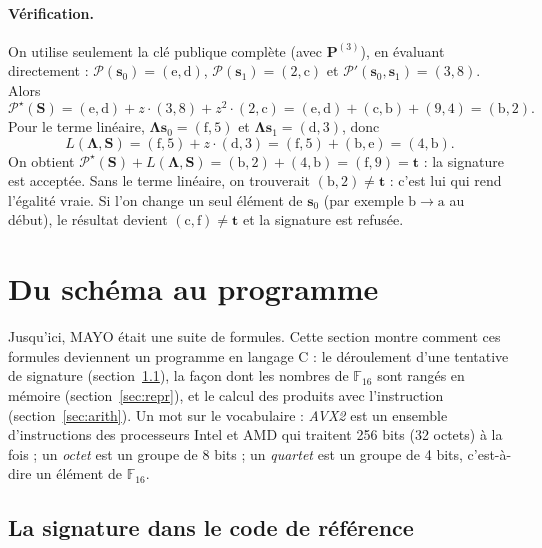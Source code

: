 \paragraph{Vérification.} On utilise seulement la clé publique complète (avec $\mathbf{P}^{(3)}$), en évaluant directement : $\mathcal{P}(\mathbf{s}_0)=(\mathrm{e},\mathrm{d})$, $\mathcal{P}(\mathbf{s}_1)=(2,\mathrm{c})$ et $\mathcal{P}'(\mathbf{s}_0,\mathbf{s}_1)=(3,8)$. Alors
\[\mathcal{P}^\star(\mathbf{S})=(\mathrm{e},\mathrm{d})+z\cdot(3,8)+z^2\cdot(2,\mathrm{c})=(\mathrm{e},\mathrm{d})+(\mathrm{c},\mathrm{b})+(9,4)=(\mathrm{b},2).\]
Pour le terme linéaire, $\boldsymbol{\Lambda}\mathbf{s}_0=(\mathrm{f},5)$ et $\boldsymbol{\Lambda}\mathbf{s}_1=(\mathrm{d},3)$, donc
\[L(\boldsymbol{\Lambda},\mathbf{S})=(\mathrm{f},5)+z\cdot(\mathrm{d},3)=(\mathrm{f},5)+(\mathrm{b},\mathrm{e})=(4,\mathrm{b}).\]
On obtient $\mathcal{P}^\star(\mathbf{S})+L(\boldsymbol{\Lambda},\mathbf{S})=(\mathrm{b},2)+(4,\mathrm{b})=(\mathrm{f},9)=\mathbf{t}$ : la signature est acceptée. Sans le terme linéaire, on trouverait $(\mathrm{b},2)\neq\mathbf{t}$ : c'est lui qui rend l'égalité vraie. Si l'on change un seul élément de $\mathbf{s}_0$ (par exemple $\mathrm{b}\to\mathrm{a}$ au début), le résultat devient $(\mathrm{c},\mathrm{f})\neq\mathbf{t}$ et la signature est refusée.

\section{Du schéma au programme}\label{sec:programme}
Jusqu'ici, MAYO était une suite de formules. Cette section montre comment ces formules deviennent un programme en langage C : le déroulement d'une tentative de signature (section~\ref{sec:code}), la façon dont les nombres de $\mathbb{F}_{16}$ sont rangés en mémoire (section~\ref{sec:repr}), et le calcul des produits avec l'instruction \vpshufb{} (section~\ref{sec:arith}). Un mot sur le vocabulaire : \emph{AVX2} est un ensemble d'instructions des processeurs Intel et AMD qui traitent 256 bits (32 octets) à la fois ; un \emph{octet} est un groupe de 8 bits ; un \emph{quartet} est un groupe de 4 bits, c'est-à-dire un élément de $\mathbb{F}_{16}$.

\subsection{La signature dans le code de référence}\label{sec:code}
